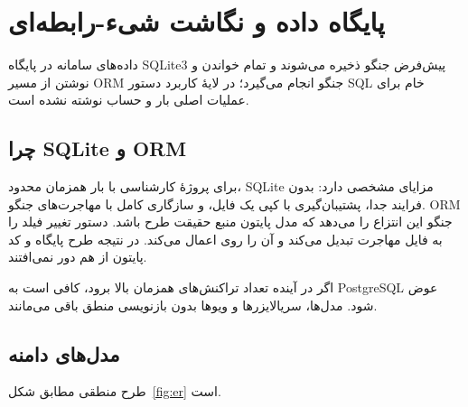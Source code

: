 \chapter[پایگاه داده]{پایگاه داده و نگاشت شیء-رابطه‌ای}

داده‌های سامانه در پایگاه \textenglish{SQLite3} پیش‌فرض جنگو ذخیره می‌شوند و تمام خواندن و نوشتن از مسیر \textenglish{ORM} جنگو انجام می‌گیرد؛ در لایهٔ کاربرد دستور \textenglish{SQL} خام برای عملیات اصلی بار و حساب نوشته نشده است.

\section{چرا SQLite و ORM}

برای پروژهٔ کارشناسی با بار همزمان محدود، \textenglish{SQLite} مزایای مشخصی دارد: بدون فرایند جدا، پشتیبان‌گیری با کپی یک فایل، و سازگاری کامل با مهاجرت‌های جنگو. \textenglish{ORM} جنگو این انتزاع را می‌دهد که مدل پایتون منبع حقیقت طرح باشد. دستور  تغییر فیلد را به فایل مهاجرت تبدیل می‌کند و  آن را روی  اعمال می‌کند. در نتیجه طرح پایگاه و کد پایتون از هم دور نمی‌افتند.

اگر در آینده تعداد تراکنش‌های همزمان بالا برود، کافی است  به \textenglish{PostgreSQL} عوض شود. مدل‌ها، سریالایزرها و ویوها بدون بازنویسی منطق باقی می‌مانند.

\section{مدل‌های دامنه}

طرح منطقی مطابق شکل~\ref{fig:er} است.

